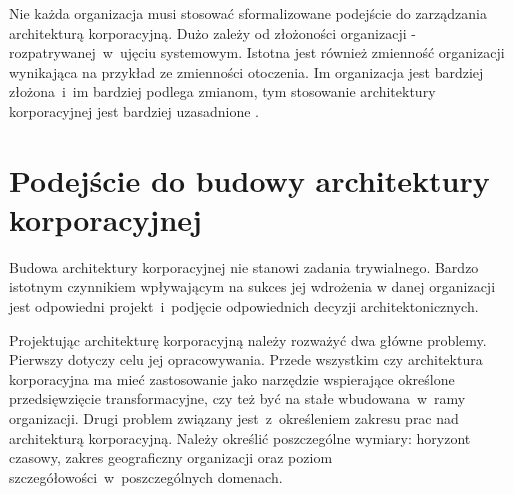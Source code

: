 Nie każda organizacja musi stosować sformalizowane podejście do zarządzania architekturą korporacyjną. Dużo zależy od złożoności organizacji - rozpatrywanej~w~ujęciu systemowym. Istotna jest również zmienność organizacji wynikająca na przykład ze zmienności otoczenia. Im organizacja jest bardziej złożona~i~im bardziej podlega zmianom, tym stosowanie architektury korporacyjnej jest bardziej uzasadnione \cite{ArchKorpSob}.

\section{Podejście do budowy architektury korporacyjnej}
Budowa architektury korporacyjnej nie stanowi zadania trywialnego. Bardzo istotnym czynnikiem wpływającym na sukces jej wdrożenia w danej organizacji jest odpowiedni projekt~i~podjęcie odpowiednich decyzji architektonicznych. 

Projektując architekturę korporacyjną należy rozważyć dwa główne problemy. Pierwszy dotyczy celu jej opracowywania. Przede wszystkim czy architektura korporacyjna ma mieć zastosowanie jako narzędzie wspierające określone przedsięwzięcie transformacyjne, czy też być na stałe wbudowana~w~ramy organizacji. Drugi problem związany jest~z~określeniem zakresu prac nad architekturą korporacyjną. Należy określić poszczególne wymiary: horyzont czasowy, zakres geograficzny organizacji oraz poziom szczegółowości~w~poszczególnych domenach. 

